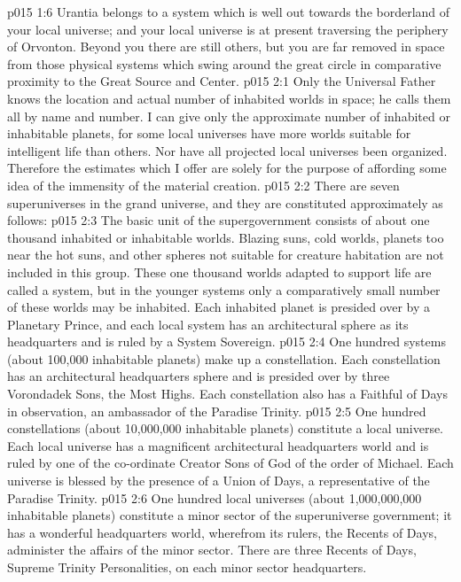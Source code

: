 \vs p015 1:6 Urantia belongs to a system which is well out towards the borderland of your local universe; and your local universe is at present traversing the periphery of Orvonton. Beyond you there are still others, but you are far removed in space from those physical systems which swing around the great circle in comparative proximity to the Great Source and Center.
\vs p015 2:1 Only the Universal Father knows the location and actual number of inhabited worlds in space; he calls them all by name and number. I can give only the approximate number of inhabited or inhabitable planets, for some local universes have more worlds suitable for intelligent life than others. Nor have all projected local universes been organized. Therefore the estimates which I offer are solely for the purpose of affording some idea of the immensity of the material creation.
\pc \vs p015 2:2 There are seven superuniverses in the grand universe, and they are constituted approximately as follows:
\pc \vs p015 2:3 \bibnobreakspace {} The basic unit of the supergovernment consists of about one thousand inhabited or inhabitable worlds. Blazing suns, cold worlds, planets too near the hot suns, and other spheres not suitable for creature habitation are not included in this group. These one thousand worlds adapted to support life are called a system, but in the younger systems only a comparatively small number of these worlds may be inhabited. Each inhabited planet is presided over by a Planetary Prince, and each local system has an architectural sphere as its headquarters and is ruled by a System Sovereign.
\pc \vs p015 2:4 \bibnobreakspace {} One hundred systems (about 100,000 inhabitable planets) make up a constellation. Each constellation has an architectural headquarters sphere and is presided over by three Vorondadek Sons, the Most Highs. Each constellation also has a Faithful of Days in observation, an ambassador of the Paradise Trinity.
\pc \vs p015 2:5 \bibnobreakspace {} One hundred constellations (about 10,000,000 inhabitable planets) constitute a local universe. Each local universe has a magnificent architectural headquarters world and is ruled by one of the co\hyp{}ordinate Creator Sons of God of the order of Michael. Each universe is blessed by the presence of a Union of Days, a representative of the Paradise Trinity.
\pc \vs p015 2:6 \bibnobreakspace {} One hundred local universes (about 1,000,000,000 inhabitable planets) constitute a minor sector of the superuniverse government; it has a wonderful headquarters world, wherefrom its rulers, the Recents of Days, administer the affairs of the minor sector. There are three Recents of Days, Supreme Trinity Personalities, on each minor sector headquarters.
